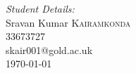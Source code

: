 \begin{titlepage}
\begin{center}
\Large \emph{Student Details:}\\ [0.2cm]
Sravan Kumar \textsc{Kairamkonda}\\[0.2cm]
\large 33673727\\[0.2cm]
\large skair001@gold.ac.uk\\[6cm] %



{\large \today}\\[2cm] %

\vfill %

\end{center}
\end{titlepage}